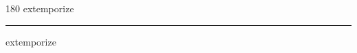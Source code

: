 
\begin{frame}
\begin{center}
\begin{turn}{180}
{\fontsize{2.5cm}{1em}\selectfont extemporize}
\end{turn}
\vspace{1em}\par  
\hrule
\vspace{1em}\par  
{\fontsize{2.5cm}{1em}\selectfont extemporize}
\end{center}
\end{frame}
